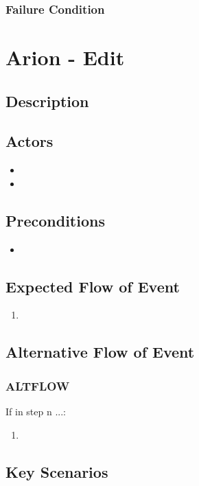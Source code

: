 \documentclass{scrreprt}
\begin{document}
    \subsection{Failure Condition}


\chapter{Arion - Edit}

\section{Description}

\section{Actors}
\begin{itemize}
    \item 
    \item 
\end{itemize}

\section{Preconditions}
\begin{itemize}
    \item 
\end{itemize}

\section{Expected Flow of Event}
\begin{enumerate}[1.]
    \item 
\end{enumerate}

\section{Alternative Flow of Event}

    \subsection{ALTFLOW}
    If in step n ...:
    \begin{enumerate}
        \item 
    \end{enumerate}

\section{Key Scenarios}
\end{document}
